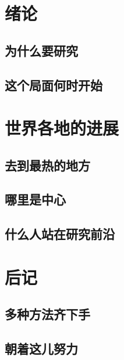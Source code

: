 \documentclass[UTF8]{ctexart}
\begin{document}
\tableofcontents   %

\chapter{绪论}
\section{为什么要研究}
\vspace{10cm}
\section{这个局面何时开始}
\vspace{10cm}
\chapter{世界各地的进展}
\section{去到最热的地方}
\vspace{10cm}
\section{哪里是中心}
\vspace{10cm}
\section{什么人站在研究前沿}
\vspace{10cm}
\chapter{后记}
\section{多种方法齐下手}
\vspace{10cm}
\section{朝着这儿努力}
\vspace{10cm}
\end{document}
